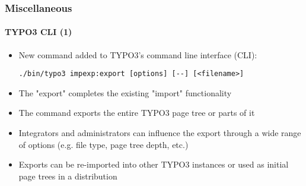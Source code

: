 %

\begin{frame}[fragile]
	\frametitle{Miscellaneous}
	\framesubtitle{TYPO3 CLI (1)}


	\begin{itemize}
		\item New command added to TYPO3's command line interface (CLI):
\begin{lstlisting}
./bin/typo3 impexp:export [options] [--] [<filename>]
\end{lstlisting}
		\item The "export" completes the existing "import" functionality
		\item The command exports the entire TYPO3 page tree or parts of it
		\item Integrators and administrators can influence the export through
			a wide range of options (e.g. file type, page tree depth, etc.)
		\item Exports can be re-imported into other TYPO3 instances or
			used as initial page trees in a distribution
	\end{itemize}

\end{frame}

